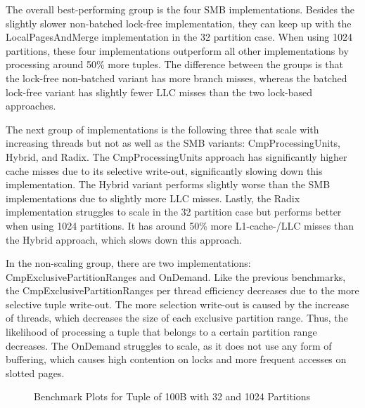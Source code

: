 The overall best-performing group is the four \ac{SMB} implementations.
Besides the slightly slower non-batched lock-free implementation, they can keep up with the Local\-Pages\-And\-Merge implementation in the 32 partition case.
When using 1024 partitions, these four implementations outperform all other implementations by processing around 50\% more tuples.
The difference between the groups is that the lock-free non-batched variant has more branch misses, whereas the batched lock-free variant has slightly fewer \ac{LLC} misses than the two lock-based approaches.

The next group of implementations is the following three that scale with increasing threads but not as well as the \ac{SMB} variants: CmpProcessingUnits, Hybrid, and Radix.
The CmpProcessingUnits approach has significantly higher cache misses due to its selective write-out, significantly slowing down this implementation.
The Hybrid variant performs slightly worse than the \ac{SMB} implementations due to slightly more \ac{LLC} misses.
Lastly, the Radix implementation struggles to scale in the 32 partition case but performs better when using 1024 partitions.
It has around 50\% more L1-cache-/\ac{LLC} misses than the Hybrid approach, which slows down this approach.

In the non-scaling group, there are two implementations: CmpExclusivePartitionRanges and OnDemand.
Like the previous benchmarks, the CmpExclusivePartitionRanges per thread efficiency decreases due to the more selective tuple write-out.
The more selection write-out is caused by the increase of threads, which decreases the size of each exclusive partition range.
Thus, the likelihood of processing a tuple that belongs to a certain partition range decreases.
The OnDemand struggles to scale, as it does not use any form of buffering, which causes high contention on locks and more frequent accesses on slotted pages.

\begin{figure}[h]
  \centering
  \begin{subfigure}{.49\textwidth}
    \centering
    \resizebox{\linewidth}{!}{}
  \end{subfigure}
  \begin{subfigure}{.49\textwidth}
    \centering
    \resizebox{\linewidth}{!}{}
  \end{subfigure}
  \begin{subfigure}{\textwidth}
    \centering
    \resizebox{\linewidth}{!}{}
  \end{subfigure}
  \caption[Shuffle Benchmark Plots for Tuple of 100B with 32 and 1024 Partitions]{Benchmark Plots for Tuple of 100B with 32 and 1024 Partitions}
  \label{plot-shuffle-100B-32-1024}
\end{figure}

